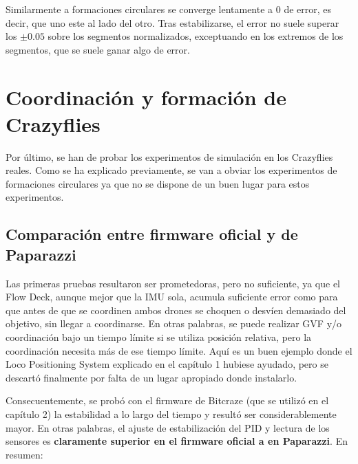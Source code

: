 Similarmente a formaciones circulares se converge lentamente a 0 de error, 
es decir, que uno este al lado del otro. Tras estabilizarse, el error no suele superar los $\pm 0.05$ sobre los segmentos normalizados, exceptuando en los extremos de los segmentos, que se suele ganar algo de error. 


\section{Coordinación y formación de Crazyflies}

Por último, se han de probar los experimentos de simulación en los Crazyflies reales.
Como se ha explicado previamente, se van a obviar los experimentos de formaciones circulares ya que no se dispone de un buen lugar para estos experimentos. 


\subsection{Comparación entre firmware oficial y de Paparazzi}

Las primeras pruebas resultaron ser prometedoras, pero no suficiente, ya que el Flow Deck, aunque mejor que la IMU sola, 
acumula suficiente error como para que antes de que se coordinen ambos drones se choquen o desvíen demasiado del objetivo, sin llegar a coordinarse. 
En otras palabras, se puede realizar GVF y/o coordinación bajo un tiempo límite si se utiliza posición relativa, 
pero la coordinación necesita más de ese tiempo límite. 
Aquí es un buen ejemplo donde el Loco Positioning System explicado en el capítulo 1 hubiese ayudado, 
pero se descartó finalmente por falta de un lugar apropiado donde instalarlo.

Consecuentemente, se probó con el firmware de Bitcraze (que se utilizó en el capítulo 2) la estabilidad a lo largo del tiempo y resultó ser considerablemente mayor. 
En otras palabras, el ajuste de estabilización del PID y lectura de los sensores es \textbf{claramente superior en el firmware oficial a en Paparazzi}. En resumen:


